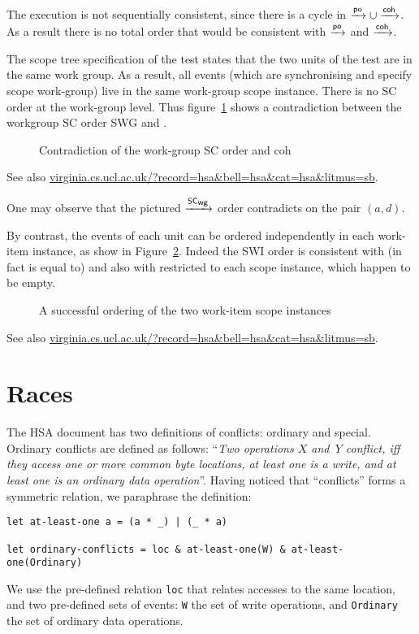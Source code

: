 \documentclass[a4paper]{article}
\begin{document}
The execution is not sequentially consistent, since there is a cycle in $\xrightarrow{\textsf{\scriptsize{}po}}
\cup \xrightarrow{\textsf{\scriptsize{}coh}}$. As a result there is no total order that would be consistent with
$\xrightarrow{\textsf{\scriptsize{}po}}$ and $\xrightarrow{\textsf{\scriptsize{}coh}}$.

The scope tree specification of the test states that the two units of the test
are in the same work group. As a result, all events (which are synchronising
and specify scope work-group) live in the same work-group scope instance.
There is no SC order at the  work-group level. Thus figure~\ref{sbwg} shows a
contradiction between the workgroup SC order SWG and \coh{}.
\begin{figure}[!h]
\vspace*{-2mm}
\begin{center}\moveback{}
\end{center}
\vspace*{-2mm}
\caption{\label{sbwg}Contradiction of the work-group SC order and coh \color{red}{(Forbidden)}}
\end{figure}
See also \url{virginia.cs.ucl.ac.uk/?record=hsa&bell=hsa&cat=hsa&litmus=sb}.

One may observe that the pictured $\xrightarrow{\textsf{\scriptsize{}SC$_{\textsf{\scriptsize{}wg}}$}}$ order contradicts \coh{} on
the pair $(a,d)$.

By contrast, the events of each unit can be ordered independently in each
work-item instance, as show in Figure~\ref{sbwi}.  Indeed the SWI order is
consistent with \po{} (in fact is equal to) and also with \coh{} restricted to
each scope instance, which happen to be empty.
\begin{figure}[!h]
\vspace*{-2mm}
\begin{center}\moveback{}
\end{center}
\vspace*{-2mm}
\caption{\label{sbwi}A successful ordering of the two work-item scope instances \color{green}{(Allowed)}}
\end{figure}
See also \url{virginia.cs.ucl.ac.uk/?record=hsa&bell=hsa&cat=hsa&litmus=sb}.

\pagebreak

\section{Races}
The HSA document has two definitions of conflicts: ordinary and special.
Ordinary conflicts are defined as follows:
``\emph{Two operations $X$ and~$Y$ conflict, iff they access one or
more common byte locations, at least one is a write, and at least one is
an ordinary data operation}''.
Having noticed that ``conflicts'' forms a symmetric relation, we paraphrase
the definition:
\begin{verbatim}
let at-least-one a = (a * _) | (_ * a)

let ordinary-conflicts = loc & at-least-one(W) & at-least-one(Ordinary)
\end{verbatim}
We use the pre-defined relation \verb+loc+ that relates accesses to the same
location, and two pre-defined sets of events: \verb+W+ the set of write
operations, and \verb+Ordinary+ the set of ordinary data operations.
\end{document}
